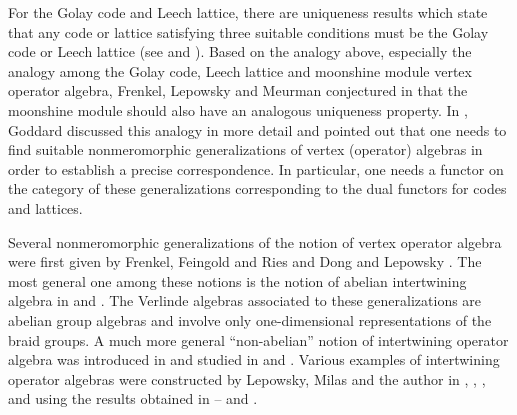 \documentclass{amsproc}
\theoremstyle{definition}
\theoremstyle{remark}
\numberwithin{equation}{section}
\begin{document}
For the Golay code and Leech
lattice, there are uniqueness results which state that any code
or lattice satisfying three suitable conditions must be
the Golay code or Leech
lattice (see \cite{C} and \cite{CN}). Based on the analogy above, especially
the analogy among the Golay code, Leech lattice and moonshine module
vertex operator algebra, Frenkel, Lepowsky and Meurman 
conjectured in \cite{FLM}
that the moonshine module should also have an analogous uniqueness
property.
In \cite{G}, Goddard discussed this analogy in more detail and
pointed out  that one needs to find suitable
nonmeromorphic 
generalizations of vertex
(operator) algebras in order to establish a precise correspondence.  In
particular, one needs a functor on the category
of these generalizations 
corresponding to the dual functors for codes and lattices. 


Several nonmeromorphic generalizations of the notion of vertex operator
algebra were first given 
by Frenkel, Feingold and Ries \cite{FFR} and
Dong and Lepowsky \cite{DL1} \cite{DL2}. The most general one among
these notions is the notion of abelian intertwining algebra in
\cite{DL1} and \cite{DL2}. The Verlinde algebras associated to these
generalizations are abelian group algebras and involve only
one-dimensional representations of the braid groups. A much more general
``non-abelian'' notion of intertwining operator algebra was introduced in
\cite{H4} and studied in \cite{H5} and \cite{H6}. Various
examples of intertwining operator algebras were constructed by
Lepowsky, Milas and the author
in \cite{H2}, \cite{H3}, \cite{HL5}, \cite{HM1} and \cite{HM2} 
using the results obtained in \cite{HL1}--\cite{HL4}
and \cite{H1}. 
\end{document}
